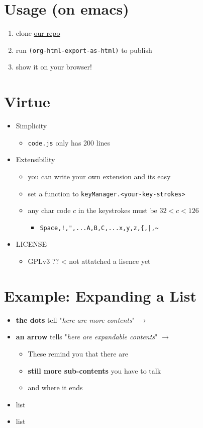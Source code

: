 \section{Usage (on emacs)}
\label{sec-3}

\begin{enumerate}
\item clone \href{https://github.com/guicho271828/another-org-info}{our repo}

\item run \texttt{(org-html-export-as-html)} to publish

\item show it on your browser!
\end{enumerate}
\section{Virtue}
\label{sec-4}

\begin{itemize}
\item Simplicity
\begin{itemize}
\item \texttt{code.js} only has 200 lines
\end{itemize}
\item Extensibility
\begin{itemize}
\item you can write your own extension and its easy
\item set a function to \texttt{keyManager.<your-key-strokes>}
\item any char code \(c\) in the keystrokes must be \(32 < c < 126\)
\begin{itemize}
\item \texttt{Space,!,",...A,B,C,...x,y,z,\{,|,\textasciitilde{}}
\end{itemize}
\end{itemize}
\item LICENSE
\begin{itemize}
\item GPLv3 ?? < not attatched a lisence yet
\end{itemize}
\end{itemize}
\section{Example: Expanding a List}
\label{sec-5}

\begin{itemize}
\item \textbf{the dots} tell "\emph{here are more contents}" \(\rightarrow\)
\item \textbf{an arrow} tells "\emph{here are expandable contents}" \(\rightarrow\)
\begin{itemize}
\item These remind you that there are
\item \textbf{still more sub-contents} you have to talk
\item and where it ends
\end{itemize}
\item list
\item list
\end{itemize}
